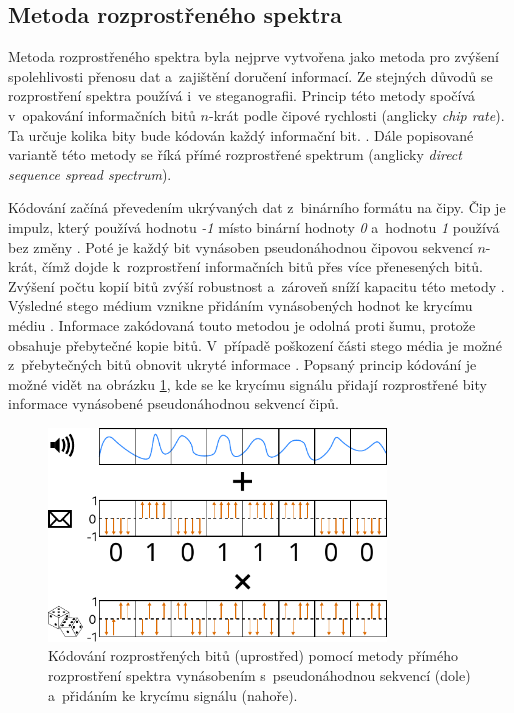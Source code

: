 \subsection*{Metoda rozprostřeného spektra}
\label{sub:dsss}

Metoda rozprostřeného spektra byla nejprve vytvořena jako metoda pro zvýšení
spolehlivosti přenosu dat a~zajištění doručení informací. Ze stejných důvodů se
rozprostření spektra používá i~ve steganografii. Princip této metody spočívá
v~opakování informačních bitů $n$-krát podle čipové rychlosti (anglicky
\textit{chip rate}). Ta určuje kolika bity bude kódován každý informační bit.
\cite{AlSabhany2020}. Dále popisované variantě této metody se říká přímé
rozprostřené spektrum (anglicky \textit{direct sequence spread spectrum}).

Kódování začíná převedením ukrývaných dat z~binárního formátu na čipy. Čip je
impulz, který používá hodnotu \textit{-1} místo binární hodnoty \textit{0}
a~hodnotu \textit{1} používá bez změny \cite{Kuznetsov2022}. Poté je každý bit
vynásoben pseudonáhodnou čipovou sekvencí $n$-krát, čímž dojde k~rozprostření
informačních bitů přes více přenesených bitů. Zvýšení počtu kopií bitů zvýší
robustnost a~zároveň sníží kapacitu této metody \cite{AlSabhany2020}. Výsledné
stego médium vznikne přidáním vynásobených hodnot ke krycímu médiu
\cite{Kuznetsov2022}. Informace zakódovaná touto metodou je odolná proti šumu,
protože obsahuje přebytečné kopie bitů. V~případě poškození části stego média
je možné z~přebytečných bitů obnovit ukryté informace \cite{Djebbar2012}.
Popsaný princip kódování je možné vidět na obrázku \ref{pic:dsss-spreading},
kde se ke krycímu signálu přidají rozprostřené bity informace vynásobené
pseudonáhodnou sekvencí čipů.

\begin{figure}[hbt]
    \centering
    \includegraphics[width=0.8\textwidth]{obrazky/direct-sequence-spread-spectrum-diagram.pdf}
    \caption{Kódování rozprostřených bitů (uprostřed) pomocí metody přímého
    rozprostření spektra vynásobením s~pseudonáhodnou sekvencí (dole)
    a~přidáním ke krycímu signálu (nahoře).}
    \label{pic:dsss-spreading}
\end{figure}

